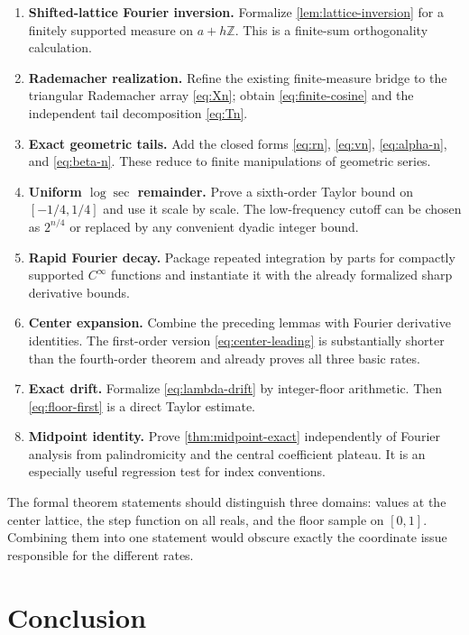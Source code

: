 \documentclass[11pt,oneside]{article}
\theoremstyle{definition}
\theoremstyle{remark}
\newcommand{\Z}{\mathbb Z}
\begin{document}
\begin{enumerate}
\item \textbf{Shifted-lattice Fourier inversion.}  Formalize \cref{lem:lattice-inversion} for
a finitely supported measure on $a+h\Z$.  This is a finite-sum orthogonality calculation.
\item \textbf{Rademacher realization.}  Refine the existing finite-measure bridge to the
triangular Rademacher array \eqref{eq:Xn}; obtain \eqref{eq:finite-cosine} and the independent
tail decomposition \eqref{eq:Tn}.
\item \textbf{Exact geometric tails.}  Add the closed forms \eqref{eq:rn}, \eqref{eq:vn},
\eqref{eq:alpha-n}, and \eqref{eq:beta-n}.  These reduce to finite manipulations of geometric
series.
\item \textbf{Uniform $\log\sec$ remainder.}  Prove a sixth-order Taylor bound on
$[-1/4,1/4]$ and use it scale by scale.  The low-frequency cutoff can be chosen as
$2^{n/4}$ or replaced by any convenient dyadic integer bound.
\item \textbf{Rapid Fourier decay.}  Package repeated integration by parts for compactly
supported $C^\infty$ functions and instantiate it with the already formalized sharp derivative
bounds.
\item \textbf{Center expansion.}  Combine the preceding lemmas with Fourier derivative
identities.  The first-order version \eqref{eq:center-leading} is substantially shorter than
the fourth-order theorem and already proves all three basic rates.
\item \textbf{Exact drift.}  Formalize \eqref{eq:lambda-drift} by integer-floor arithmetic.
Then \eqref{eq:floor-first} is a direct Taylor estimate.
\item \textbf{Midpoint identity.}  Prove \cref{thm:midpoint-exact} independently of Fourier
analysis from palindromicity and the central coefficient plateau.  It is an especially useful
regression test for index conventions.
\end{enumerate}

The formal theorem statements should distinguish three domains: values at the center lattice,
the step function on all reals, and the floor sample on $[0,1]$.  Combining them into one
statement would obscure exactly the coordinate issue responsible for the different rates.

\section{Conclusion}
\label{sec:conclusion}
\end{document}
